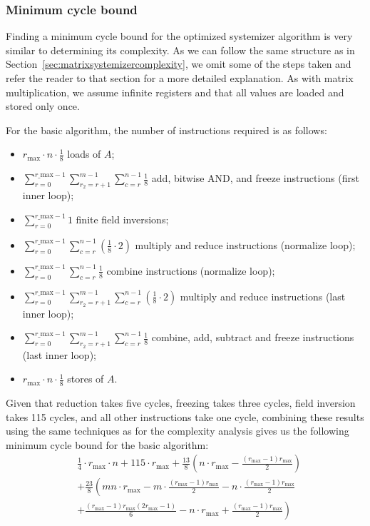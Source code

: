 \documentclass[11pt,a4paper]{report}
\theoremstyle{definition}
\begin{document}
\subsubsection{Minimum cycle bound}
Finding a minimum cycle bound for the optimized systemizer algorithm is very similar to determining its complexity. As we can follow the same structure as in Section~\ref{sec:matrixsystemizercomplexity}, we omit some of the steps taken and refer the reader to that section for a more detailed explanation. As with matrix multiplication, we assume infinite registers and that all values are loaded and stored only once.

For the basic algorithm, the number of instructions required is as follows:
\begin{itemize}
  \item $r_\text{max} \cdot n \cdot \frac{1}{8}$ loads of $A$;
  \item $\sum_{r=0}^{r\_\text{max}-1} \sum_{r_2=r+1}^{m-1} \sum_{c=r}^{n-1} \frac{1}{8}$ add, bitwise AND, and freeze instructions (first inner loop);
  \item $\sum_{r=0}^{r\_\text{max}-1} 1$ finite field inversions;
  \item $\sum_{r=0}^{r\_\text{max}-1} \sum_{c=r}^{n-1} (\frac{1}{8} \cdot 2)$ multiply and reduce instructions (normalize loop);
  \item $\sum_{r=0}^{r\_\text{max}-1} \sum_{c=r}^{n-1} \frac{1}{8}$ combine instructions (normalize loop);
  \item $\sum_{r=0}^{r\_\text{max}-1} \sum_{r_2=r+1}^{m-1} \sum_{c=r}^{n-1} (\frac{1}{8} \cdot 2)$ multiply and reduce instructions (last inner loop);
  \item $\sum_{r=0}^{r\_\text{max}-1} \sum_{r_2=r+1}^{m-1} \sum_{c=r}^{n-1} \frac{1}{8}$ combine, add, subtract and freeze instructions (last inner loop);
  \item $r_\text{max} \cdot n \cdot \frac{1}{8}$ stores of $A$.
\end{itemize}

\pagebreak

Given that reduction takes five cycles, freezing takes three cycles, field inversion takes 115 cycles, and all other instructions take one cycle, combining these results using the same techniques as for the complexity analysis gives us the following minimum cycle bound for the basic algorithm:
\begin{align*}
   & \frac{1}{4} \cdot r_\text{max} \cdot n + 115 \cdot r_\text{max} + \frac{13}{8} \left( n \cdot r_\text{max} - \frac{(r_\text{max} - 1)r_{\text{max}}}{2} \right) \\
   & + \frac{23}{8} \left( mn \cdot r_\text{max} - m \cdot \frac{(r_\text{max} - 1)r_{\text{max}}}{2} - n \cdot \frac{(r_\text{max} - 1)r_{\text{max}}}{2} \right.   \\
   & \left. + \frac{(r_\text{max} - 1)r_{\text{max}}(2r_{\text{max}} - 1)}{6} - n \cdot r_\text{max} + \frac{(r_\text{max} - 1)r_{\text{max}}}{2} \right)
\end{align*}
\end{document}
